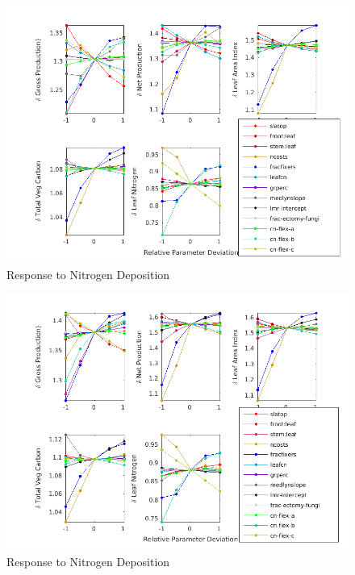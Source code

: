 \documentclass[draft,linenumbers]{agujournal}
\begin{document}
  
 \begin{figure}[h]
     \centering
     \includegraphics[width=35pc]{matlab/figures/frac_deviation_CO2_response_1CLM5_bci_0.1x0.1_v4.0i_ens_transient_ELEV_PI_y1.png}
     \caption{Response to Nitrogen Deposition}
     \label{BCI CO2 response}
  \end{figure}
  
  
 \begin{figure}[h]
     \centering
     \includegraphics[width=35pc]{matlab/figures/frac_deviation_CO2_response_1CLM5_1x1pt_Br-cax_ens_transient_ELEV_PI_y1.png}
     \caption{Response to Nitrogen Deposition}
     \label{CAX state}
  \end{figure}
  
\end{document}
